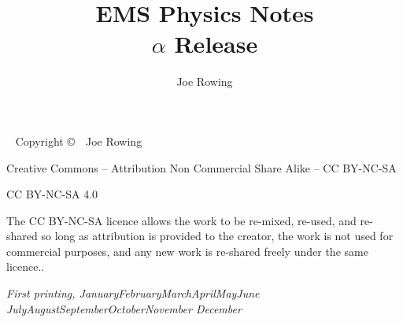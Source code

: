 \documentclass{tufte-book}
\title{EMS Physics Notes \\ $\alpha$ Release}
\author[Joe Rowing]{Joe Rowing}
\newcommand{\monthyear}{%
  \ifcase\month\or January\or February\or March\or April\or May\or June\or
  July\or August\or September\or October\or November\or
  December\fi\space\number\year
}
\newcommand{\blankpage}{\newpage\hbox{}\thispagestyle{empty}\newpage}
\begin{document}



\maketitle


\newpage
\begin{fullwidth}
~\vfill
\thispagestyle{empty}
\setlength{\parindent}{0pt}
\setlength{\parskip}{\baselineskip}
Copyright \copyright\ \the\year\ Joe Rowing

\par{}

\par{}

\par Creative Commons – Attribution Non Commercial Share Alike – CC BY-NC-SA

CC BY-NC-SA 4.0

The CC BY-NC-SA licence allows the work to be re-mixed, re-used, and re-shared so long as  attribution is provided to the creator, the work is not used for commercial purposes, and any new work is re-shared freely under the same licence..

\par\textit{First printing, \monthyear}
\end{fullwidth}

\tableofcontents
















%

% 
% 
% 
% 
% 
% 
% 
% 
% 
% 
% 
% 
% 
% 
%
\setcounter{tocdepth}{10}
\listoftodos
\printindex
\end{document}
